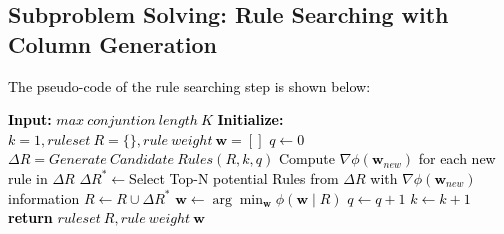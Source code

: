 \documentclass{article} %
\begin{document}
\subsection{Subproblem Solving: Rule Searching with Column Generation}
\textcolor{black}{
The pseudo-code of the rule searching step is shown below:}
\begin{algorithm}
\caption{\textcolor{black}{Solving Frank-Wolfe Step using Column Generation}}
\begin{algorithmic}[1]
\State \textcolor{black}{\textbf{Input:}} \textcolor{black}{$max\ conjuntion\ length\ K$}
\State \textcolor{black}{\textbf{Initialize:}} \textcolor{black}{$k = 1, ruleset\ R=\{\}, rule\ weight\ \boldsymbol{w}=[]$}
\While{\textcolor{black}{$stopping\ condition\ 1\ not\ met$}}
    \While{\textcolor{black}{$k \leq K$}}  \Comment{\textcolor{black}{BFS}}
    \State \textcolor{black}{$q \leftarrow 0$}
        \While{\textcolor{black}{$stopping\ condition\ 2\ not\ met$}}
            \State \textcolor{black}{$\Delta R= Generate\ Candidate\ Rules(R, k, q)$}
            \State \textcolor{black}{Compute $\nabla \phi(\boldsymbol{w}_{new})$ for each new rule in $\Delta R$}
            \State \textcolor{black}{$\Delta R^*\leftarrow$Select Top-N potential Rules from $\Delta R$ with $\nabla \phi(\boldsymbol{w}_{new})$ information}
            \State \textcolor{black}{$R \leftarrow R \cup \Delta R^*$}
            \State \textcolor{black}{$\boldsymbol{w} \gets \arg \min_{\boldsymbol{w}} \phi\left( \boldsymbol{w} \mid R  \right)$}
            \State \textcolor{black}{$q \leftarrow q + 1$}
        \EndWhile
        \State \textcolor{black}{$k \leftarrow k + 1$}
    \EndWhile
\EndWhile    
\State \textcolor{black}{\textbf{return}  $ruleset\ R, rule\ weight\ \boldsymbol{w}$}
\end{algorithmic}
\end{algorithm}
\end{document}
